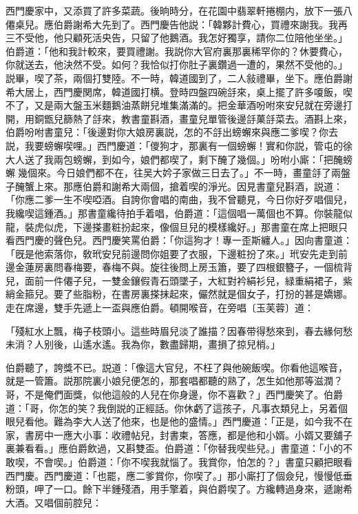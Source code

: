 西門慶家中，又添買了許多菜蔬。後晌時分，在花園中翡翠軒捲棚内，放下一張八僊桌兒。應伯爵謝希大先到了。西門慶告他説：「韓夥計費心，買禮來謝我。我再三不受他，他只顧死活央告，只留了他鵝酒。我怎好獨享，請你二位陪他坐坐。」伯爵道：「他和我計較來，要買禮謝。我説你大官府裏那裏稀罕你的？休要費心，你就送去，他決然不受。如何？我恰似打你肚子裏鑽過一遭的，果然不受他的。」説畢，喫了茶，兩個打雙陸。不一時，韓道國到了，二人敍禮畢，坐下。應伯爵謝希大居上，西門慶関席，韓道國打横。登時四盤四碗㧱來，桌上擺了許多嗄飯，喫不了，又是兩大盤玉米麵鵝油蒸餅兒堆集滿滿的。把金華酒吩咐來安兒就在旁邊打開，用銅甑兒篩熱了㧱來，教書童斟酒，畫童兒單管後邊㧱菓㧱菜去。酒斟上來，伯爵吩咐書童兒：「後邊對你大娘房裏説，怎的不㧱出螃蠏來與應二爹喫？你去説，我要螃蠏喫哩。」西門慶道：「儍狗才，那裏有一個螃蠏！實和你説，管屯的徐大人送了我兩包螃蠏，到如今，娘們都喫了，剩下醃了幾個。」吩咐小廝：「把醃螃蠏𢵞幾個來。今日娘們都不在，往吴大妗子家做三日去了。」不一時，畫童㧱了兩盤子醃蟹上來。那應伯爵和謝希大兩個，搶着喫的淨光。因見書童兒斟酒，説道：「你應二爹一生不喫啞酒。自誇你會唱的南曲，我不曾聽見，今日你好歹唱個兒，我纔喫這鍾酒。」那書童纔待拍手着唱，伯爵道：「這個唱一萬個也不算。你裝龍似龍，裝虎似虎，下邊搽畫粧扮起來，像個旦兒的模樣纔好。」那書童在席上把眼只看西門慶的聲色兒。西門慶笑罵伯爵：「你這狗才！專一歪斯纏人。」因向書童道：「旣是他索落你，敎玳安兒前邊問你姐要了衣服，下邊粧扮了來。」玳安先走到前邊金蓮房裏問春梅要，春梅不與。旋往後問上房玉簫，要了四根銀簪子，一個梳背兒，面前一件僊子兒，一雙金鑲假青石頭墜子，大紅對衿絹衫兒，緑重絹裙子，紫綃金箍兒。要了些脂粉，在書房裏搽抹起來，儼然就是個女子，打扮的甚是嬌娜。走在席邊，雙手先遞上一盃與應伯爵。頓開喉音，在旁唱〔玉芙蓉〕道：

\begin{myquote}
「殘紅水上飄，梅子枝頭小。這些時眉兒淡了誰描？因春带得愁來到，春去緣何愁未消？人别後，山遙水遙。我為你，數盡歸期，畫損了掠兒梢。」
\end{myquote}

伯爵聽了，誇獎不已。説道：「像這大官兒，不枉了與他碗飯喫。你看他這喉音，就是一管簫。説那院裏小娘兒便怎的，那套唱都聽的熟了，怎生如他那等滋潤？哥，不是俺們面獎，似他這般的人兒在你身邊，你不喜歡？」西門慶笑了。伯爵道：「哥，你怎的笑？我倒説的正經話。你休虧了這孩子，凡事衣類兒上，另着個眼兒看他。難為李大人送了他來，也是他的盛情。」西門慶道：「正是，如今我不在家，書房中一應大小事：收禮帖兒，封書柬，答應，都是他和小婿。小婿又要舖子裏兼看看。」應伯爵飲過，又斟雙盃。伯爵道：「你替我喫些兒。」書童道：「小的不敢喫，不會喫。」伯爵道：「你不喫我就惱了。我賞你，怕怎的？」書童只顧把眼看西門慶。西門慶道：「也罷，應二爹賞你，你喫了。」那小廝打了個僉兒，慢慢低垂粉頭，呷了一口。餘下半鍾殘酒，用手擎着，與伯爵喫了。方纔轉過身來，遞謝希大酒。又唱個前腔兒：

